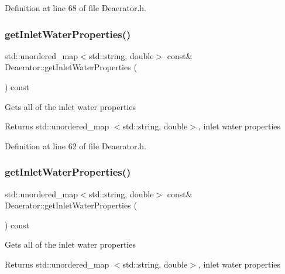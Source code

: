 Definition at line 68 of file Deaerator.\+h.

\mbox{\label{class_deaerator_a6dccf8495324c76a5d9b6128c57c0427}} 
\subsubsection{\texorpdfstring{get\+Inlet\+Water\+Properties()}{getInletWaterProperties()}\hspace{0.1cm}{\footnotesize\ttfamily [1/3]}}
{\footnotesize\ttfamily std\+::unordered\+\_\+map$<$std\+::string, double$>$ const\& Deaerator\+::get\+Inlet\+Water\+Properties (\begin{DoxyParamCaption}{ }\end{DoxyParamCaption}) const\hspace{0.3cm}{\ttfamily [inline]}}

Gets all of the inlet water properties \begin{DoxyReturn}{Returns}
std\+::unordered\+\_\+map $<$std\+::string, double$>$, inlet water properties 
\end{DoxyReturn}


Definition at line 62 of file Deaerator.\+h.

\mbox{\label{class_deaerator_a6dccf8495324c76a5d9b6128c57c0427}} 
\subsubsection{\texorpdfstring{get\+Inlet\+Water\+Properties()}{getInletWaterProperties()}\hspace{0.1cm}{\footnotesize\ttfamily [2/3]}}
{\footnotesize\ttfamily std\+::unordered\+\_\+map$<$std\+::string, double$>$ const\& Deaerator\+::get\+Inlet\+Water\+Properties (\begin{DoxyParamCaption}{ }\end{DoxyParamCaption}) const\hspace{0.3cm}{\ttfamily [inline]}}

Gets all of the inlet water properties \begin{DoxyReturn}{Returns}
std\+::unordered\+\_\+map $<$std\+::string, double$>$, inlet water properties 
\end{DoxyReturn}


